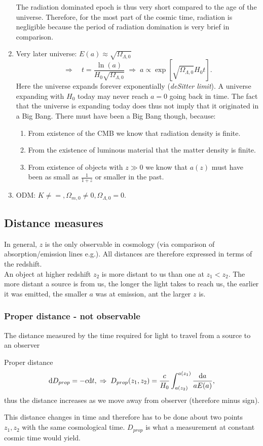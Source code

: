 \begin{enumerate}
\begin{equation}
\end{equation}
The radiation dominated epoch is thus very short compared to the age of the universe. Therefore, for the most part of the cosmic time, radiation is negligible because the period of radiation domination is very brief in comparison.
\item Very later universe: $E(a)\approx \sqrt{\Omega_{\Lambda,0}}$
\begin{equation}
	\Rightarrow \quad t = \frac{\ln(a)}{H_0 \sqrt{\Omega_{\Lambda,0}}} \; \Rightarrow \; a \propto \exp\left[\sqrt{\Omega_{\Lambda,0}} H_0 t\right].
\end{equation}
Here the universe expands forever exponentially (\emph{deSitter limit}). A universe expanding with $H_0$ today may never reach $a=0$ going back in time. The fact that the universe is expanding today does thus not imply that it originated in a Big Bang. There must have been a Big Bang though, because:
\begin{enumerate}
	\item From existence of the CMB we know that radiation density is finite.
	\item From the existence of luminous material that the matter density is finite.
	\item From existence of objects with $z\gg 0$ we know that $a(z)$ must have been as small as $\frac{1}{1+z}$ or smaller in the past.
\end{enumerate}
\item ODM: $K\neq =,\Omega_{m,0} \neq 0, \Omega_{\Lambda,0}=0$.
\end{enumerate}

\subsection{Distance measures}
In general, $z$ is the only observable in cosmology (via comparison of absorption/emission lines e.g.). All distances are therefore expressed in terms of the redshift.\\
An object at higher redshift $z_2$ is more distant to us than one at $z_1 < z_2$. The more distant a source is from us, the longer the light takes to reach us, the earlier it was emitted, the smaller $a$ was at emission, ant the larger $z$ is.
\subsubsection{Proper distance - not observable}
The distance measured by the time required for light to travel from a source to an observer
\begin{mybox}{Proper distance}
	\begin{equation}
		\mathrm{d} D_{prop} =-c \mathrm{d} t,\; \Rightarrow\;	D_{prop}(z_1,z_2)= \frac{c}{H_0} \int_{a(z_2)}^{a(z_1)} \frac{\mathrm{d} a}{a E(a)},
	\end{equation}
	thus the distance increases as we move away from observer (therefore minus sign).
\end{mybox}
This distance changes in time and therefore has to be done about two points $z_1,z_2$ with the same cosmological time. $D_{prop}$ is what a measurement at constant cosmic time would yield.
